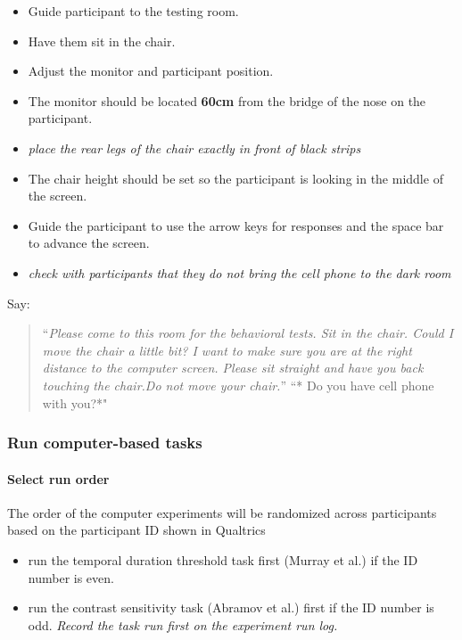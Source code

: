 \documentclass[]{article}
\providecommand{\tightlist}{%
  \setlength{\itemsep}{0pt}\setlength{\parskip}{0pt}}
\let\oldparagraph\paragraph
\renewcommand{\paragraph}[1]{\oldparagraph{#1}\mbox{}}
\begin{document}
\begin{itemize}
\tightlist
\item
  Guide participant to the testing room.
\item
  Have them sit in the chair.
\item
  Adjust the monitor and participant position.
\item
  The monitor should be located \textbf{60cm} from the bridge of the
  nose on the participant.
\item
  \emph{place the rear legs of the chair exactly in front of black
  strips}
\item
  The chair height should be set so the participant is looking in the
  middle of the screen.
\item
  Guide the participant to use the arrow keys for responses and the
  space bar to advance the screen.
\item
  \emph{check with participants that they do not bring the cell phone to
  the dark room}
\end{itemize}

Say:

\begin{quote}
``\emph{Please come to this room for the behavioral tests. Sit in the
chair. Could I move the chair a little bit? I want to make sure you are
at the right distance to the computer screen. Please sit straight and
have you back touching the chair.Do not move your chair.}'' ``* Do you
have cell phone with you?*"
\end{quote}

\subsubsection{Run computer-based tasks}\label{run-computer-based-tasks}

\paragraph{Select run order}\label{select-run-order}

The order of the computer experiments will be randomized across
participants based on the participant ID shown in Qualtrics

\begin{itemize}
\tightlist
\item
  run the temporal duration threshold task first (Murray et al.) if the
  ID number is even.
\item
  run the contrast sensitivity task (Abramov et al.) first if the ID
  number is odd. \emph{Record the task run first on the experiment run
  log.}
\end{itemize}
\end{document}
